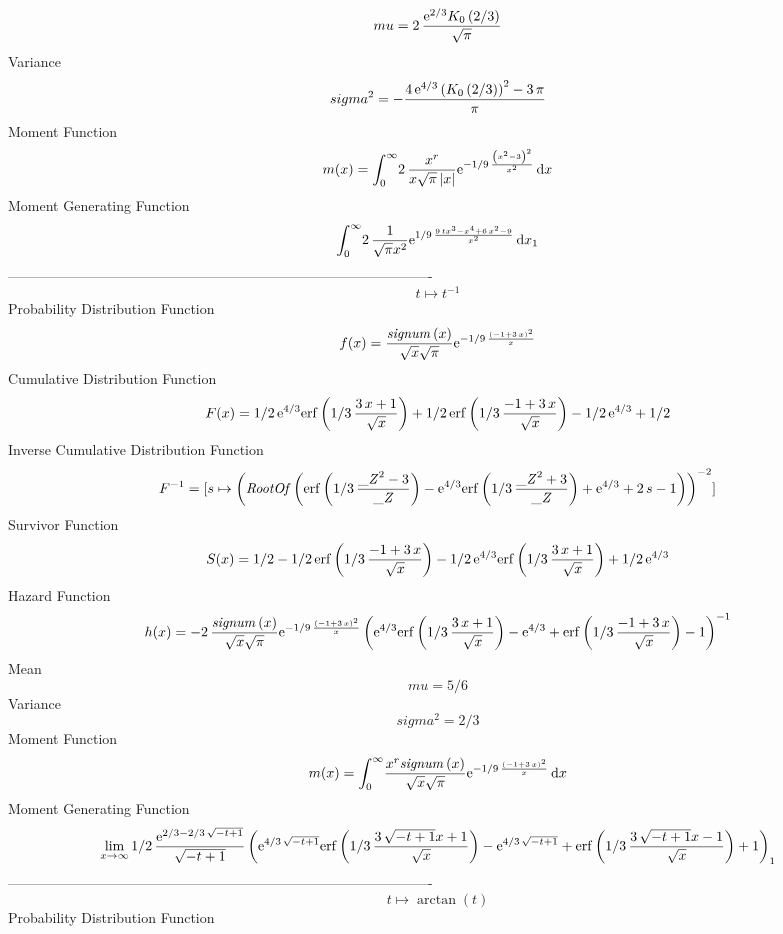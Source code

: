 \documentclass[12pt]{article}
\begin{document}
 $$ mu=2\,{\frac {{{\rm e}^{2/3}}{{\sl K}_{0}\left(2/3\right)}}{\sqrt {\pi}}}
$$ Variance 
 $$ sigma^2 = -{\frac {4\,{{\rm e}^{4/3}} \left( {{\sl K}_{0}\left(2/3\right)}
 \right) ^{2}-3\,\pi}{\pi}}
$$Moment Function 
 $$ m(x) = \int_{0}^{\infty }\!2\,{\frac {{x}^{r}}{x\sqrt {\pi} \left| x \right| 
}{{\rm e}^{-1/9\,{\frac { \left( {x}^{2}-3 \right) ^{2}}{{x}^{2}}}}}}
\,{\rm d}x
$$ Moment Generating Function 
 $$\int_{0}^{\infty }\!2\,{\frac {1}{\sqrt {\pi}{x}^{2}}{{\rm e}^{1/9\,{
\frac {9\,t{x}^{3}-{x}^{4}+6\,{x}^{2}-9}{{x}^{2}}}}}}\,{\rm d}x_{{1}}
$$-------------------------------------------------------------------------------------------  \\$$t\mapsto {t}^{-1}
$$Probability Distribution Function 
$$  f(x)={\frac {{\it signum} \left( x \right) }{\sqrt {x}\sqrt {\pi}}{{\rm e}^
{-1/9\,{\frac { \left( -1+3\,x \right) ^{2}}{x}}}}}
$$Cumulative Distribution Function  
 $$F(x)=1/2\,{{\rm e}^{4/3}}{\rm erf} \left(1/3\,{\frac {3\,x+1}{\sqrt {x}}}
\right)+1/2\,{\rm erf} \left(1/3\,{\frac {-1+3\,x}{\sqrt {x}}}\right)-
1/2\,{{\rm e}^{4/3}}+1/2
$$ Inverse Cumulative Distribution Function 
  $$F^{-1} = [s\mapsto  \left( {\it RootOf} \left( {\rm erf} \left(1/3\,{\frac {{{
\it \_Z}}^{2}-3}{{\it \_Z}}}\right)-{{\rm e}^{4/3}}{\rm erf} \left(1/3
\,{\frac {{{\it \_Z}}^{2}+3}{{\it \_Z}}}\right)+{{\rm e}^{4/3}}+2\,s-1
 \right)  \right) ^{-2}]
$$Survivor Function 
 $$ S(x)=1/2-1/2\,{\rm erf} \left(1/3\,{\frac {-1+3\,x}{\sqrt {x}}}\right)-1/2
\,{{\rm e}^{4/3}}{\rm erf} \left(1/3\,{\frac {3\,x+1}{\sqrt {x}}}
\right)+1/2\,{{\rm e}^{4/3}}
$$ Hazard Function 
 $$ h(x)=-2\,{\frac {{\it signum} \left( x \right) }{\sqrt {x}\sqrt {\pi}}{
{\rm e}^{-1/9\,{\frac { \left( -1+3\,x \right) ^{2}}{x}}}} \left( {
{\rm e}^{4/3}}{\rm erf} \left(1/3\,{\frac {3\,x+1}{\sqrt {x}}}\right)-
{{\rm e}^{4/3}}+{\rm erf} \left(1/3\,{\frac {-1+3\,x}{\sqrt {x}}}
\right)-1 \right) ^{-1}}
$$Mean 
 $$ mu=5/6
$$ Variance 
 $$ sigma^2 = 2/3
$$Moment Function 
 $$ m(x) = \int_{0}^{\infty }\!{\frac {{x}^{r}{\it signum} \left( x \right) }{
\sqrt {x}\sqrt {\pi}}{{\rm e}^{-1/9\,{\frac { \left( -1+3\,x \right) ^
{2}}{x}}}}}\,{\rm d}x
$$ Moment Generating Function 
 $$\lim _{x\rightarrow \infty }1/2\,{\frac {{{\rm e}^{2/3-2/3\,\sqrt {-t+
1}}}}{\sqrt {-t+1}} \left( {{\rm e}^{4/3\,\sqrt {-t+1}}}{\rm erf} 
\left(1/3\,{\frac {3\,\sqrt {-t+1}x+1}{\sqrt {x}}}\right)-{{\rm e}^{4/
3\,\sqrt {-t+1}}}+{\rm erf} \left(1/3\,{\frac {3\,\sqrt {-t+1}x-1}{
\sqrt {x}}}\right)+1 \right) }_{{1}}
$$-------------------------------------------------------------------------------------------  \\$$t\mapsto \arctan \left( t \right) 
$$Probability Distribution Function 
\end{document}
